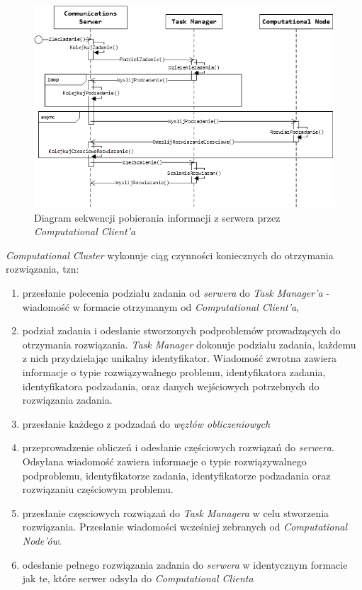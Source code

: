\documentclass[12pt,a4paper,titlepage]{report}
\begin{document}
	
	\begin{figure}[h]
		\centering
		\caption{Diagram sekwencji pobierania informacji z serwera przez \textit{Computational Client'a}}
		\includegraphics[width=\textwidth]{img/communication/computation.png}
	\end{figure}    
    
    
    \textit{Computational Cluster} wykonuje ciąg czynności koniecznych do otrzymania rozwiązania, tzn:
	\begin{enumerate}[(1)]
		\item przesłanie polecenia podziału zadania od \textit{serwera} do \textit{Task Manager'a} - wiadomość w formacie otrzymanym od \textit{Computational Client'a},
		\item podział zadania i odesłanie stworzonych podproblemów prowadzących do otrzymania rozwiązania. \textit{Task Manager} dokonuje podziału zadania, każdemu z nich przydzielając unikalny identyfikator. Wiadomość zwrotna zawiera informacje o 
		typie rozwiązywalnego problemu, identyfikatora zadania, identyfikatora podzadania, oraz danych wejściowych potrzebnych do rozwiązania zadania.
		
		
		
		\item przesłanie każdego z podzadań do \textit{węzłów obliczeniowych}
		\item przeprowadzenie obliczeń i odesłanie częściowych rozwiązań do \textit{serwera}. Odsyłana wiadomość zawiera informacje o 
		typie rozwiązywalnego podproblemu, identyfikatorze zadania, identyfikatorze podzadania oraz rozwiązaniu częściowym problemu.
		\item przesłanie częsciowych rozwiązań do \textit{Task Managera} w celu stworzenia rozwiązania. Przesłanie wiadomości wcześniej zebranych od \textit{Computational Node'ów}.
		\item odesłanie pełnego rozwiązania zadania do \textit{serwera} w identycznym formacie jak te, które serwer odsyła do \textit{Computational Clienta}
	\end{enumerate}
\end{document}
